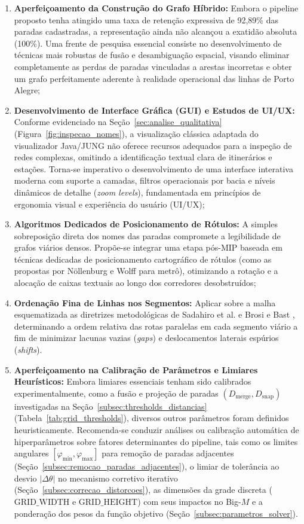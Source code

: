 \documentclass[cic,tc]{infufrgs}
\begin{document}
\begin{enumerate}
    \item \textbf{Aperfeiçoamento da Construção do Grafo Híbrido:} Embora o pipeline proposto tenha atingido uma taxa de retenção expressiva de 92,89\% das paradas cadastradas, a representação ainda não alcançou a exatidão absoluta (100\%). Uma frente de pesquisa essencial consiste no desenvolvimento de técnicas mais robustas de fusão e desambiguação espacial, visando eliminar completamente as perdas de paradas vinculadas a arestas incorretas e obter um grafo perfeitamente aderente à realidade operacional das linhas de Porto Alegre;
    \item \textbf{Desenvolvimento de Interface Gráfica (GUI) e Estudos de UI/UX:} Conforme evidenciado na Seção~\ref{sec:analise_qualitativa} (Figura~\ref{fig:inspecao_nomes}), a visualização clássica adaptada do visualizador Java/JUNG não oferece recursos adequados para a inspeção de redes complexas, omitindo a identificação textual clara de itinerários e estações. Torna-se imperativo o desenvolvimento de uma interface interativa moderna com suporte a camadas, filtros operacionais por bacia e níveis dinâmicos de detalhe (\textit{zoom levels}), fundamentada em princípios de ergonomia visual e experiência do usuário (UI/UX);
    \item \textbf{Algoritmos Dedicados de Posicionamento de Rótulos:} A simples sobreposição direta dos nomes das paradas compromete a legibilidade de grafos viários densos. Propõe-se integrar uma etapa pós-MIP baseada em técnicas dedicadas de posicionamento cartográfico de rótulos (como as propostas por Nöllenburg e Wolff para metrô), otimizando a rotação e a alocação de caixas textuais ao longo dos corredores desobstruídos;
    \item \textbf{Ordenação Fina de Linhas nos Segmentos:} Aplicar sobre a malha esquematizada as diretrizes metodológicas de Sadahiro et al. \cite{Sadahiro2016} e Brosi e Bast \cite{brosi2023large}, determinando a ordem relativa das rotas paralelas em cada segmento viário a fim de minimizar lacunas vazias (\textit{gaps}) e deslocamentos laterais espúrios (\textit{shifts}).
    \item \textbf{Aperfeiçoamento na Calibração de Parâmetros e Limiares Heurísticos:} Embora limiares essenciais tenham sido calibrados experimentalmente, como a fusão e projeção de paradas $(D_{\text{merge}}, D_{\text{snap}})$ investigadas na Seção~\ref{subsec:thresholds_distancias} (Tabela~\ref{tab:grid_thresholds}), diversos outros parâmetros foram definidos heuristicamente. Recomenda-se conduzir análises ou calibração automática de hiperparâmetros sobre fatores determinantes do pipeline, tais como os limites angulares $[\varphi_{\min}, \varphi_{\max}]$ para remoção de paradas adjacentes (Seção~\ref{subsec:remocao_paradas_adjacentes}), o limiar de tolerância ao desvio $|\Delta\theta|$ no mecanismo corretivo iterativo (Seção~\ref{subsec:correcao_distorcoes}), as dimensões da grade discreta ($\text{GRID\_WIDTH}$ e $\text{GRID\_HEIGHT}$) com seus impactos no Big-$M$ e a ponderação dos pesos da função objetivo (Seção~\ref{subsec:parametros_solver}).

\end{enumerate}
\end{document}
